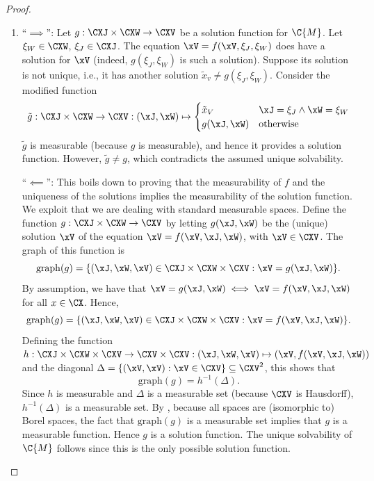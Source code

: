 \begin{proof}
  \begin{enumerate}
    \item 
    ``$\implies$'': Let $g : \CXJ \times \CXW \to \CXV$ be a solution function for $\C{M}$. 
    Let $\xi_W\in\CXW$, $\xi_J\in\CXJ$. The equation $\xV = f(\xV,\xi_J,\xi_W)$ does have a solution for
    $\xV$ (indeed, $g(\xi_J,\xi_W)$ is such a solution). Suppose its solution is not unique, i.e., it has another
    solution $\tilde{x}_v \ne g(\xi_J,\xi_W)$. Consider the modified function
      $$\tilde{g} : \CXJ \times \CXW \to \CXV : (\xJ,\xW) \mapsto \begin{cases}
        \tilde{x}_V & \xJ = \xi_J \land \xW = \xi_W \\
        g(\xJ,\xW)  & \text{otherwise}
      \end{cases}$$
    $\tilde{g}$ is measurable (because $g$ is measurable), and hence it provides a solution function. 
    However, $\tilde{g} \ne g$, which contradicts the assumed unique solvability.

    ``$\impliedby$'':
    This boils down to proving that the measurability of $f$ and the uniqueness of the solutions implies the measurability of the solution function.
    We exploit that we are dealing with standard measurable spaces.
    Define the function $g : \CXJ \times \CXW \to \CXV$ by letting $g(\xJ,\xW)$ be the (unique) solution $\xV$ of the
    equation $\xV = f(\xV,\xJ,\xW)$, with $\xV\in\CXV$. The graph of this function is
    $$\mathrm{graph}(g) = \{(\xJ,\xW,\xV) \in \CXJ \times \CXW \times \CXV : \xV = g(\xJ,\xW)\}.$$
    By assumption, we have that $\xV = g(\xJ,\xW) \iff \xV = f(\xV,\xJ,\xW)$ for all $x \in \CX$. Hence,
    $$\mathrm{graph}(g) = \{(\xJ,\xW,\xV) \in \CXJ \times \CXW \times \CXV : \xV = f(\xV,\xJ,\xW)\}.$$
    Defining the function 
    $h : \CXJ \times \CXW \times \CXV \to \CXV \times \CXV : (\xJ,\xW,\xV) \mapsto (\xV, f(\xV,\xJ,\xW))$ and the diagonal
    $\Delta = \{(\xV,\xV) : \xV \in \CXV\} \subseteq \CXV^2$, this shows that
    $$\mathrm{graph}(g) = h^{-1}(\Delta).$$
    Since $h$ is measurable and $\Delta$ is a measurable set (because $\CXV$ is Hausdorff), $h^{-1}(\Delta)$ is a measurable set.
    By \cite[14.12]{Kec95}, because all spaces are (isomorphic to) Borel spaces, the fact that $\mathrm{graph}(g)$ is a measurable set implies that $g$ is a measurable function. Hence $g$ is a solution function. The unique solvability of $\C{M}$ follows since this is the only possible solution function.


\end{enumerate}
\end{proof}
